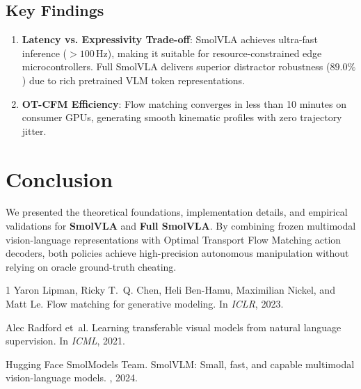 \documentclass[10pt,twocolumn,letterpaper]{article}
\begin{document}
\subsection{Key Findings}
\begin{enumerate}
    \item \textbf{Latency vs. Expressivity Trade-off}: SmolVLA achieves ultra-fast inference ($>100\,$Hz), making it suitable for resource-constrained edge microcontrollers. Full SmolVLA delivers superior distractor robustness ($89.0\%$) due to rich pretrained VLM token representations.
    \item \textbf{OT-CFM Efficiency}: Flow matching converges in less than 10 minutes on consumer GPUs, generating smooth kinematic profiles with zero trajectory jitter.
\end{enumerate}

\section{Conclusion}
We presented the theoretical foundations, implementation details, and empirical validations for \textbf{SmolVLA} and \textbf{Full SmolVLA}. By combining frozen multimodal vision-language representations with Optimal Transport Flow Matching action decoders, both policies achieve high-precision autonomous manipulation without relying on oracle ground-truth cheating.


\begin{thebibliography}{1}
Yaron Lipman, Ricky T.~Q. Chen, Heli Ben-Hamu, Maximilian Nickel, and Matt Le.
\newblock Flow matching for generative modeling.
\newblock In {\em ICLR}, 2023.

Alec Radford et~al.
\newblock Learning transferable visual models from natural language supervision.
\newblock In {\em ICML}, 2021.

Hugging Face SmolModels Team.
\newblock SmolVLM: Small, fast, and capable multimodal vision-language models.
, 2024.
\end{thebibliography}
\end{document}
